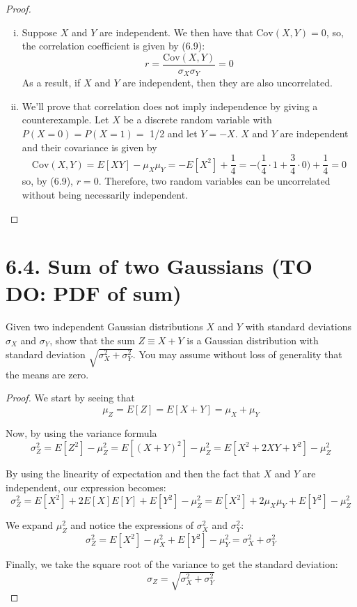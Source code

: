 \begin{proof}
    \hfill
    \begin{enumerate}[(i)]
        \item Suppose $X$ and $Y$ are independent. We then have that $\text{Cov}(X, Y) = 0$, so,
            the correlation coefficient is given by (6.9):
            \[
                r = \frac{\text{Cov}(X, Y)}{\sigma_X\sigma_Y} = 0
            \] 
            As a result, if $X$ and $Y$ are independent, then they are also uncorrelated.

        \item We'll prove that correlation does not imply independence by giving a counterexample.
            Let $X$ be a discrete random variable with $P(X = 0) = P(X = 1) =$ 1/2 and let
            $Y = -X$. $X$ and $Y$ are independent and their covariance is given by
            \[
                \text{Cov}(X, Y) = E[XY] - \mu_X\mu_Y 
                = -E[X^2] + \frac{1}{4} 
                = -\bigg(\frac{1}{4} \cdot 1 + \frac{3}{4} \cdot 0\bigg) + \frac{1}{4}
                = 0
            \] 
            so, by (6.9), $r = 0$. Therefore, two random variables can be uncorrelated
            without being necessarily independent.
    \end{enumerate}
\end{proof}

\section*{6.4. Sum of two Gaussians (TO DO: PDF of sum)}
Given two independent Gaussian distributions $X$ and $Y$ with
standard deviations $\sigma_X$ and $\sigma_Y$, show that the sum
$Z \equiv X + Y$ is a Gaussian distribution with standard
deviation $\sqrt{\sigma_X^2 + \sigma_Y^2}$. You may assume without
loss of generality that the means are zero.

\vspace{1em}

\begin{proof}
    We start by seeing that
    \[
        \mu_Z = E[Z] = E[X + Y] = \mu_X + \mu_Y
    \] 

    Now, by using the variance formula
    \[
        \sigma_Z^2 = E[Z^2] - \mu_Z^2 
        = E[(X+Y)^2] - \mu_Z^2
        = E[X^2 + 2XY + Y^2] - \mu_Z^2
    \] 

    By using the linearity of expectation and then the fact that $X$ and $Y$ are
    independent, our expression becomes:
     \[
         \sigma_Z^2 
         = E[X^2] + 2E[X]E[Y] + E[Y^2] - \mu_Z^2
         = E[X^2] + 2\mu_X\mu_Y + E[Y^2] - \mu_Z^2
    \] 

    We expand $\mu_Z^2$ and notice the expressions of $\sigma_X^2$ and $\sigma_Y^2$:
     \[
         \sigma_Z^2 = E[X^2] - \mu_X^2 + E[Y^2] - \mu_Y^2 = \sigma_X^2 + \sigma_Y^2
    \] 

    Finally, we take the square root of the variance to get the standard deviation:
    \[
        \sigma_Z = \sqrt{\sigma_X^2 + \sigma_Y^2}
    \] 
\end{proof}

